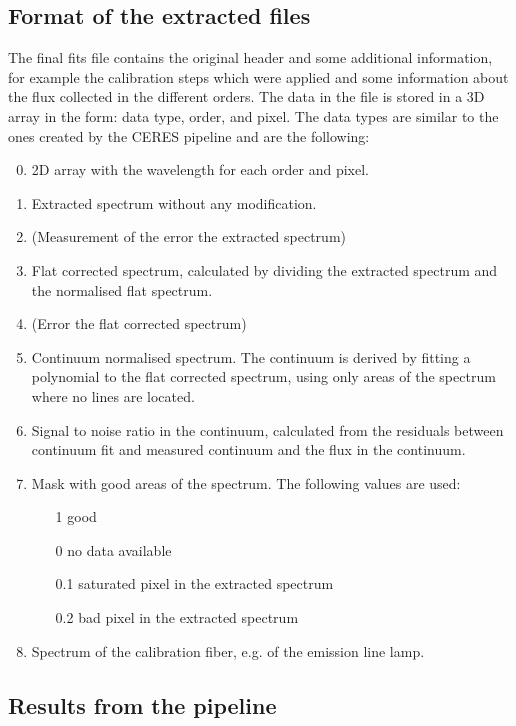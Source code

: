 \documentclass[10pt,a4paper]{article}
\begin{document}
\subsection{Format of the extracted files}
\label{section:extraction_data_format}
The final fits file contains the original header and some additional information, for example the calibration steps which were applied and some information about the flux collected in the different orders. The data in the file is stored in a 3D array in the form: data type, order, and pixel. The data types are similar to the ones created by the CERES pipeline and are the following:
\begin{enumerate}
  \setcounter{enumi}{-1}
  \item 2D array with the wavelength for each order and pixel.
  \item Extracted spectrum without any modification.
  \item (Measurement of the error the extracted spectrum)
  \item Flat corrected spectrum, calculated by dividing the extracted spectrum and the normalised flat spectrum.
  \item (Error the flat corrected spectrum)
  \item Continuum normalised spectrum. The continuum is derived by fitting a polynomial to the flat corrected spectrum, using only areas of the spectrum where no lines are located. 
  \item Signal to noise ratio in the continuum, calculated from the residuals between continuum fit and measured continuum and the flux in the continuum.
  \item Mask with good areas of the spectrum. The following values are used:
  \begin{itemize}
    \item[1] good
    \item[0] no data available
    \item[0.1] saturated pixel in the extracted spectrum
    \item[0.2] bad pixel in the extracted spectrum
  \end{itemize}
  \item Spectrum of the calibration fiber, e.g. of the emission line lamp.
\end{enumerate}

\subsection{Results from the pipeline}
\label{section:results_pipeline}
\end{document}
